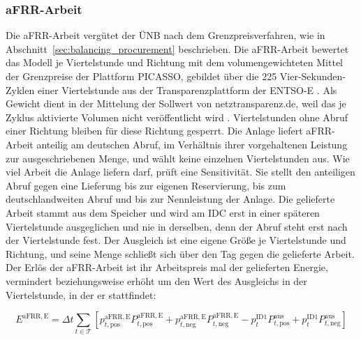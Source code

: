 \subsubsection*{\acs{aFRR}-Arbeit}
Die \ac{aFRR}-Arbeit vergütet der \ac{ÜNB} nach dem Grenzpreisverfahren, wie in Abschnitt~\ref{sec:balancing_procurement} beschrieben.
Die \ac{aFRR}-Arbeit bewertet das Modell je Viertelstunde und Richtung mit dem volumengewichteten Mittel der Grenzpreise der Plattform PICASSO, gebildet über die 225 Vier-Sekunden-Zyklen einer Viertelstunde aus der Transparenzplattform der ENTSO-E \cite{entsoe_transparency_2026}.
Als Gewicht dient in der Mittelung der Sollwert von netztransparenz.de, weil das je Zyklus aktivierte Volumen nicht veröffentlicht wird \cite{netztransparenz_regelenergie_2026}.
Viertelstunden ohne Abruf einer Richtung bleiben für diese Richtung gesperrt.
Die Anlage liefert \ac{aFRR}-Arbeit anteilig am deutschen Abruf, im Verhältnis ihrer vorgehaltenen Leistung zur ausgeschriebenen Menge, und wählt keine einzelnen Viertelstunden aus.
Wie viel Arbeit die Anlage liefern darf, prüft eine Sensitivität.
Sie stellt den anteiligen Abruf gegen eine Lieferung bis zur eigenen Reservierung, bis zum deutschlandweiten Abruf und bis zur Nennleistung der Anlage.
Die gelieferte Arbeit stammt aus dem Speicher und wird am \ac{IDC} erst in einer späteren Viertelstunde ausgeglichen und nie in derselben, denn der Abruf steht erst nach der Viertelstunde fest.
Der Ausgleich ist eine eigene Größe je Viertelstunde und Richtung, und seine Menge schließt sich über den Tag gegen die gelieferte Arbeit.
Der Erlös der \ac{aFRR}-Arbeit ist ihr Arbeitspreis mal der gelieferten Energie, vermindert beziehungsweise erhöht um den Wert des Ausgleichs in der Viertelstunde, in der er stattfindet:

\begin{equation}
    \label{eq:erloes_afrr_e}
    E^{\mathrm{aFRR,E}} = \Delta t \sum_{t \in \mathcal{T}} \left[ p^{\mathrm{aFRR,E}}_{t,\mathrm{pos}} P^{\mathrm{aFRR,E}}_{t,\mathrm{pos}} + p^{\mathrm{aFRR,E}}_{t,\mathrm{neg}} P^{\mathrm{aFRR,E}}_{t,\mathrm{neg}} - p^{\mathrm{ID1}}_t P^{\mathrm{aus}}_{t,\mathrm{pos}} + p^{\mathrm{ID1}}_t P^{\mathrm{aus}}_{t,\mathrm{neg}} \right]
\end{equation}

